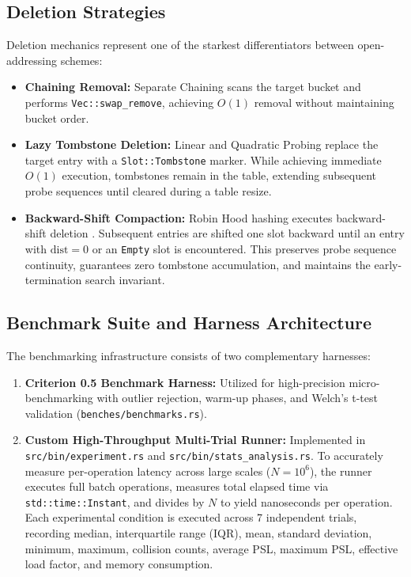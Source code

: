 \documentclass[conference]{IEEEtran}
\begin{document}
\subsection{Deletion Strategies}

Deletion mechanics represent one of the starkest differentiators between open-addressing schemes:
\begin{itemize}
  \item \textbf{Chaining Removal:} Separate Chaining scans the target bucket and performs \texttt{Vec::swap\_remove}, achieving $O(1)$ removal without maintaining bucket order.
  \item \textbf{Lazy Tombstone Deletion:} Linear and Quadratic Probing replace the target entry with a \texttt{Slot::Tombstone} marker. While achieving immediate $O(1)$ execution, tombstones remain in the table, extending subsequent probe sequences until cleared during a table resize.
  \item \textbf{Backward-Shift Compaction:} Robin Hood hashing executes backward-shift deletion \cite{celis1986}. Subsequent entries are shifted one slot backward until an entry with $\text{dist} = 0$ or an \texttt{Empty} slot is encountered. This preserves probe sequence continuity, guarantees zero tombstone accumulation, and maintains the early-termination search invariant.
\end{itemize}

\subsection{Benchmark Suite and Harness Architecture}

The benchmarking infrastructure consists of two complementary harnesses:
\begin{enumerate}
  \item \textbf{Criterion 0.5 Benchmark Harness:} Utilized for high-precision micro-benchmarking with outlier rejection, warm-up phases, and Welch's t-test validation (\texttt{benches/benchmarks.rs}).
  \item \textbf{Custom High-Throughput Multi-Trial Runner:} Implemented in \texttt{src/bin/experiment.rs} and \texttt{src/bin/stats\_analysis.rs}. To accurately measure per-operation latency across large scales ($N = 10^6$), the runner executes full batch operations, measures total elapsed time via \texttt{std::time::Instant}, and divides by $N$ to yield nanoseconds per operation. Each experimental condition is executed across 7 independent trials, recording median, interquartile range (IQR), mean, standard deviation, minimum, maximum, collision counts, average PSL, maximum PSL, effective load factor, and memory consumption.
\end{enumerate}
\end{document}

